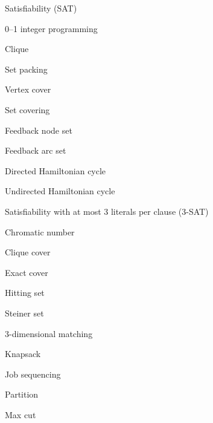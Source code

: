 \documentclass{amsart}
\theoremstyle{plain}
\begin{document}
\begin{deepitemize}
  \item Satisfiability (SAT)
    \begin{deepitemize}
      \item 0--1 integer programming
      \item Clique
        \begin{deepitemize}
          \item Set packing
          \item Vertex cover
            \begin{deepitemize}
              \item Set covering
              \item Feedback node set
              \item Feedback arc set
              \item Directed Hamiltonian cycle
                \begin{deepitemize}
                  \item Undirected Hamiltonian cycle
                \end{deepitemize}
            \end{deepitemize}
        \end{deepitemize}
      \item Satisfiability with at most 3 literals per clause (3-SAT)
        \begin{deepitemize}
          \item Chromatic number
            \begin{deepitemize}
              \item Clique cover
              \item Exact cover
                \begin{deepitemize}
                  \item Hitting set
                  \item Steiner set
                  \item 3-dimensional matching
                  \item Knapsack
                    \begin{deepitemize}
                      \item Job sequencing
                      \item Partition
                        \begin{deepitemize}
                          \item Max cut
                        \end{deepitemize}
                    \end{deepitemize}
                \end{deepitemize}
            \end{deepitemize}
        \end{deepitemize}
    \end{deepitemize}
\end{deepitemize}
\end{document}
